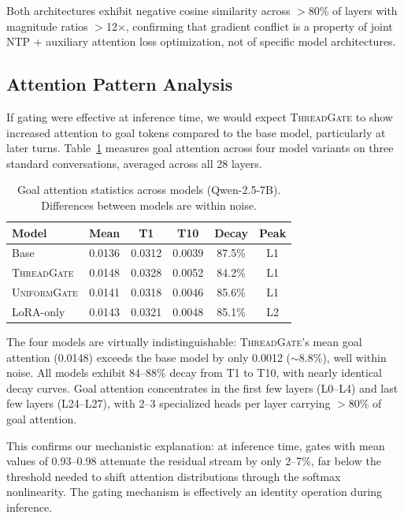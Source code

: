 \documentclass[11pt,a4paper]{article}
\newcommand{\tg}{\textsc{ThreadGate}}
\newcommand{\ug}{\textsc{UniformGate}}
\begin{document}
Both architectures exhibit negative cosine similarity across $>$80\% of layers with magnitude ratios $>$12$\times$, confirming that gradient conflict is a property of joint NTP + auxiliary attention loss optimization, not of specific model architectures.

\subsection{Attention Pattern Analysis}
\label{sec:attention-analysis}

If gating were effective at inference time, we would expect \tg{} to show increased attention to goal tokens compared to the base model, particularly at later turns.
Table~\ref{tab:attention} measures goal attention across four model variants on three standard conversations, averaged across all 28 layers.

\begin{table}[H]
\centering
\caption{Goal attention statistics across models (Qwen-2.5-7B). Differences between models are within noise.}
\label{tab:attention}
\begin{tabular}{lccccc}
\toprule
\textbf{Model} & \textbf{Mean} & \textbf{T1} & \textbf{T10} & \textbf{Decay} & \textbf{Peak} \\
\midrule
Base      & 0.0136 & 0.0312 & 0.0039 & 87.5\% & L1 \\
\tg{}     & 0.0148 & 0.0328 & 0.0052 & 84.2\% & L1 \\
\ug{}     & 0.0141 & 0.0318 & 0.0046 & 85.6\% & L1 \\
LoRA-only & 0.0143 & 0.0321 & 0.0048 & 85.1\% & L2 \\
\bottomrule
\end{tabular}
\end{table}

The four models are virtually indistinguishable: \tg{}'s mean goal attention (0.0148) exceeds the base model by only 0.0012 ($\sim$8.8\%), well within noise.
All models exhibit 84--88\% decay from T1 to T10, with nearly identical decay curves.
Goal attention concentrates in the first few layers (L0--L4) and last few layers (L24--L27), with 2--3 specialized heads per layer carrying $>$80\% of goal attention.

This confirms our mechanistic explanation: at inference time, gates with mean values of 0.93--0.98 attenuate the residual stream by only 2--7\%, far below the threshold needed to shift attention distributions through the softmax nonlinearity.
The gating mechanism is effectively an identity operation during inference.
\end{document}
